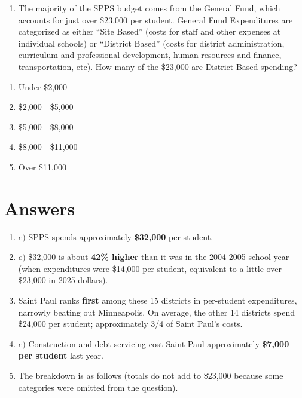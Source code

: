 \documentclass[
]{article}
\providecommand{\tightlist}{%
  \setlength{\itemsep}{0pt}\setlength{\parskip}{0pt}}
\begin{document}
\begin{enumerate}
\def\labelenumi{\arabic{enumi}.}
\setcounter{enumi}{5}
\tightlist
\item
  The majority of the SPPS budget comes from the General Fund, which
  accounts for just over \$23,000 per student. General Fund Expenditures
  are categorized as either ``Site Based'' (costs for staff and other
  expenses at individual schools) or ``District Based'' (costs for
  district administration, curriculum and professional development,
  human resources and finance, transportation, etc). How many of the
  \$23,000 are District Based spending?
\end{enumerate}

\begin{enumerate}
\def\labelenumi{\alph{enumi})}
\tightlist
\item
  Under \$2,000
\item
  \$2,000 - \$5,000
\item
  \$5,000 - \$8,000
\item
  \$8,000 - \$11,000
\item
  Over \$11,000
\end{enumerate}

\section{Answers}\label{answers}

\begin{enumerate}
\def\labelenumi{\arabic{enumi}.}
\item
  \(e)\) SPPS spends approximately \textbf{\$32,000} per student.
\item
  \(e)\) \$32,000 is about \textbf{42\% higher} than it was in the
  2004-2005 school year (when expenditures were \$14,000 per student,
  equivalent to a little over \$23,000 in 2025 dollars).
\item
  Saint Paul ranks \textbf{first} among these 15 districts in
  per-student expenditures, narrowly beating out Minneapolis. On
  average, the other 14 districts spend \$24,000 per student;
  approximately 3/4 of Saint Paul's costs.
\item
  \(e)\) Construction and debt servicing cost Saint Paul approximately
  \textbf{\$7,000 per student} last year.
\item
  The breakdown is as follows (totals do not add to \$23,000 because
  some categories were omitted from the question).
\end{enumerate}
\end{document}

